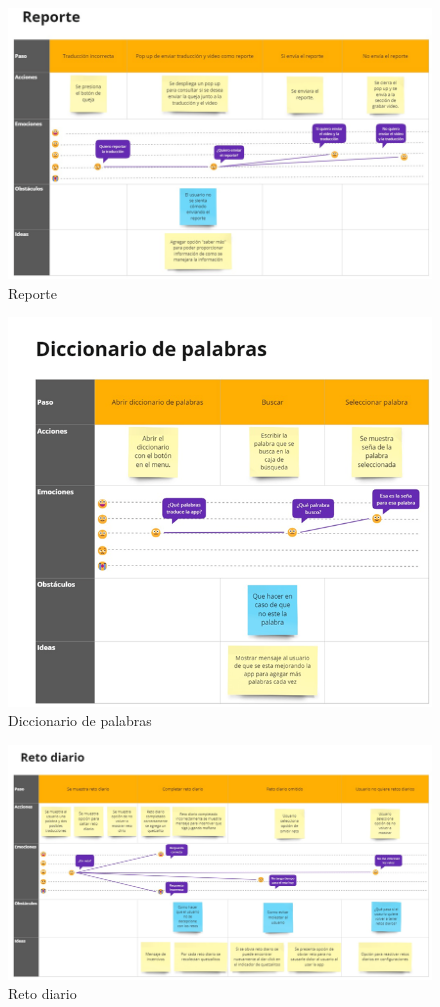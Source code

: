 \begin{figure} [H]
    \centering
    \includegraphics[width=1\linewidth]{figuras/mapa_exp4.png}
    \caption{Reporte}
    \label{fig:enter-label}
\end{figure}

\begin{figure} [H]
    \centering
    \includegraphics[width=0.8\linewidth]{figuras/mapa_exp5.png}
    \caption{Diccionario de palabras}
    \label{fig:enter-label}
\end{figure}

\begin{figure} [H]
    \centering
    \includegraphics[width=1\linewidth]{figuras/mapa_exp6.png}
    \caption{Reto diario}
    \label{fig:enter-label}
\end{figure}

